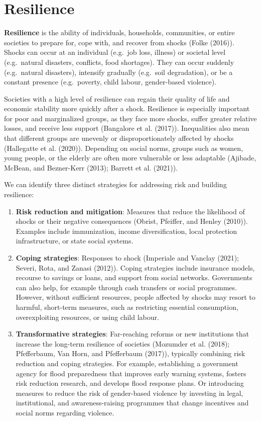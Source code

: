 \documentclass[
  a4paper,
  openany]{book}
\begin{document}
\section{Resilience}\label{resilience}

\textbf{Resilience} is the ability of individuals, households,
communities, or entire societies to prepare for, cope with, and recover
from shocks (Folke (2016)). Shocks can occur at an individual (e.g.~job
loss, illness) or societal level (e.g.~natural disasters, conflicts,
food shortages). They can occur suddenly (e.g.~natural disasters),
intensify gradually (e.g.~soil degradation), or be a constant presence
(e.g.~poverty, child labour, gender-based violence).

Societies with a high level of resilience can regain their quality of
life and economic stability more quickly after a shock. Resilience is
especially important for poor and marginalized groups, as they face more
shocks, suffer greater relative losses, and receive less support
(Bangalore et al. (2017)). Inequalities also mean that different groups
are unevenly or disproportionately affected by shocks (Hallegatte et al.
(2020)). Depending on social norms, groups such as women, young people,
or the elderly are often more vulnerable or less adaptable (Ajibade,
McBean, and Bezner-Kerr (2013); Barrett et al. (2021)).

We can identify three distinct strategies for addressing risk and
building resilience:

\begin{enumerate}
\def\labelenumi{\arabic{enumi}.}
\item
  \textbf{Risk reduction and mitigation}: Measures that reduce the
  likelihood of shocks or their negative consequences (Obrist, Pfeiffer,
  and Henley (2010)). Examples include immunization, income
  diversification, local protection infrastructure, or state social
  systems.
\item
  \textbf{Coping strategies}: Responses to shock (Imperiale and Vanclay
  (2021); Severi, Rota, and Zanasi (2012)). Coping strategies include
  insurance models, recourse to savings or loans, and support from
  social networks. Governments can also help, for example through cash
  transfers or social programmes. However, without sufficient resources,
  people affected by shocks may resort to harmful, short-term measures,
  such as restricting essential consumption, overexploiting resources,
  or using child labour.
\item
  \textbf{Transformative strategies}: Far-reaching reforms or new
  institutions that increase the long-term resilience of societies
  (Mozumder et al. (2018); Pfefferbaum, Van Horn, and Pfefferbaum
  (2017)), typically combining risk reduction and coping strategies. For
  example, establishing a government agency for flood preparedness that
  improves early warning systems, fosters risk reduction research, and
  develops flood response plans. Or introducing measures to reduce the
  risk of gender-based violence by investing in legal, institutional,
  and awareness-raising programmes that change incentives and social
  norms regarding violence.
\end{enumerate}
\end{document}
